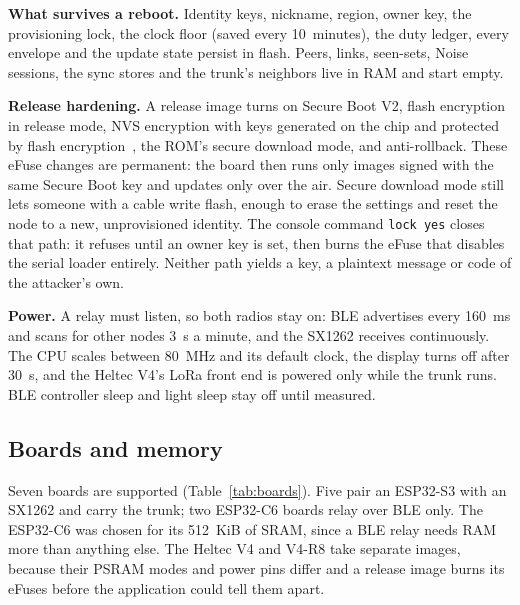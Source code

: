 \documentclass[conference]{IEEEtran}
\newcommand{\code}[1]{\texttt{#1}}
\begin{document}
\textbf{What survives a reboot.} Identity keys, nickname, region, owner key, the provisioning lock, the clock floor (saved every 10~minutes), the duty ledger, every envelope and the update state persist in flash. Peers, links, seen-sets, Noise sessions, the sync stores and the trunk's neighbors live in RAM and start empty.

\textbf{Release hardening.} A release image turns on Secure Boot V2, flash encryption in release mode, NVS encryption with keys generated on the chip and protected by flash encryption~\cite{espidf_flashenc,espidf_nvsenc}, the ROM's secure download mode, and anti-rollback. These eFuse changes are permanent: the board then runs only images signed with the same Secure Boot key and updates only over the air. Secure download mode still lets someone with a cable write flash, enough to erase the settings and reset the node to a new, unprovisioned identity. The console command \code{lock yes} closes that path: it refuses until an owner key is set, then burns the eFuse that disables the serial loader entirely. Neither path yields a key, a plaintext message or code of the attacker's own.

\textbf{Power.} A relay must listen, so both radios stay on: BLE advertises every 160~ms and scans for other nodes 3~s a minute, and the SX1262 receives continuously. The CPU scales between 80~MHz and its default clock, the display turns off after 30~s, and the Heltec V4's LoRa front end is powered only while the trunk runs. BLE controller sleep and light sleep stay off until measured.

\subsection{Boards and memory}
\label{sec:memory}

Seven boards are supported (Table~\ref{tab:boards}). Five pair an ESP32-S3 with an SX1262 and carry the trunk; two ESP32-C6 boards relay over BLE only. The ESP32-C6 was chosen for its 512~KiB of SRAM, since a BLE relay needs RAM more than anything else. The Heltec V4 and V4-R8 take separate images, because their PSRAM modes and power pins differ and a release image burns its eFuses before the application could tell them apart.
\end{document}

